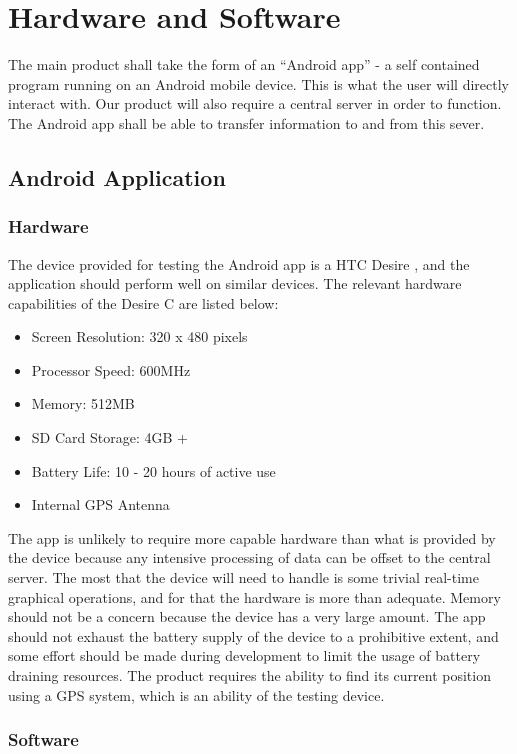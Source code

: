 \section{Hardware and Software}
	The main product shall take the form of an ``Android app'' - a self contained program running on an Android mobile device. This is what the user will directly interact with. Our product will also require a central server in order to function. The Android app shall be able to transfer information to and from this sever.
	\subsection{Android Application}
		\subsubsection{Hardware}
			The device provided for testing the Android app is a HTC Desire , and the application should perform well on similar devices. The relevant hardware capabilities of the Desire C are listed below\cite{htcdesirex}:

			\begin{itemize}
				\item Screen Resolution: 320 x 480 pixels
				\item Processor Speed: 600MHz
				\item Memory: 512MB
				\item SD Card Storage: 4GB +
				\item Battery Life: 10 - 20 hours of active use
				\item Internal GPS Antenna
			\end{itemize}

			\noindent
			The app is unlikely to require more capable hardware than what is provided by the device because any intensive processing of data can be offset to the central server. The most that the device will need to handle is some trivial real-time graphical operations, and for that the hardware is more than adequate. Memory should not be a concern because the device has a very large amount. The app should not exhaust the battery supply of the device to a prohibitive extent, and some effort should be made during development to limit the usage of battery draining resources. The product requires the ability to find its current position using a GPS system, which is an ability of the testing device.
		\subsubsection{Software}
